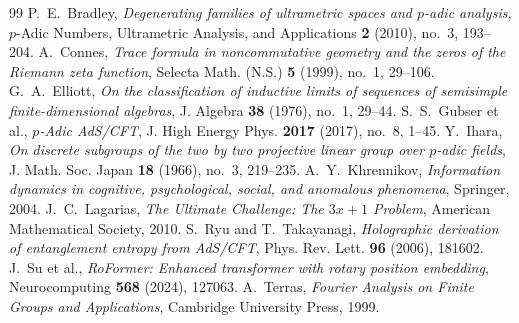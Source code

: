 \documentclass[11pt,reqno]{article}
\theoremstyle{plain}
\theoremstyle{definition}
\theoremstyle{remark}
\begin{document}
\begin{thebibliography}{99}
 P.~E.~Bradley, \emph{Degenerating families of ultrametric spaces and $p$-adic analysis}, $p$-Adic Numbers, Ultrametric Analysis, and Applications \textbf{2} (2010), no.~3, 193--204.
 A.~Connes, \emph{Trace formula in noncommutative geometry and the zeros of the Riemann zeta function}, Selecta Math. (N.S.) \textbf{5} (1999), no.~1, 29--106.
 G.~A.~Elliott, \emph{On the classification of inductive limits of sequences of semisimple finite-dimensional algebras}, J. Algebra \textbf{38} (1976), no.~1, 29--44.
 S.~S.~Gubser et al., \emph{$p$-Adic AdS/CFT}, J. High Energy Phys. \textbf{2017} (2017), no.~8, 1--45.
 Y.~Ihara, \emph{On discrete subgroups of the two by two projective linear group over $p$-adic fields}, J. Math. Soc. Japan \textbf{18} (1966), no.~3, 219--235.
 A.~Y.~Khrennikov, \emph{Information dynamics in cognitive, psychological, social, and anomalous phenomena}, Springer, 2004.
 J.~C.~Lagarias, \emph{The Ultimate Challenge: The $3x+1$ Problem}, American Mathematical Society, 2010.
 S.~Ryu and T.~Takayanagi, \emph{Holographic derivation of entanglement entropy from AdS/CFT}, Phys. Rev. Lett. \textbf{96} (2006), 181602.
 J.~Su et al., \emph{RoFormer: Enhanced transformer with rotary position embedding}, Neurocomputing \textbf{568} (2024), 127063.
 A.~Terras, \emph{Fourier Analysis on Finite Groups and Applications}, Cambridge University Press, 1999.
\end{thebibliography}
\end{document}
